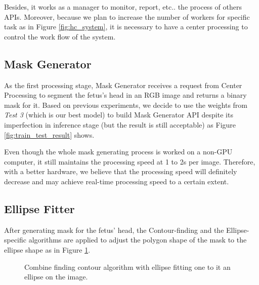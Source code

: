 	Besides, it works as a manager to monitor, report, etc.. the process of others APIs. Moreover, because we plan to increase the number of workers for specific task as in Figure \ref{fig:hc_system}, it is necessary to have a center processing to control the work flow of the system.

\subsection{Mask Generator}
\noindent
	
	As the first processing stage, Mask Generator receives a request from Center Processing to segment the fetus's head in an RGB image and returns a binary mask for it. Based on previous experiments, we decide to use the weights from \textit{Test 3} (which is our best model) to build Mask Generator API despite its imperfection in inference stage (but the result is still acceptable) as Figure \ref{fig:train_test_result} shows. 
	
	Even though the whole mask generating process is worked on a non-GPU computer, it still maintains the processing speed at 1 to 2s per image. Therefore, with a better hardware, we believe that the processing speed will definitely decrease and may achieve real-time processing speed to a certain extent.
	
\subsection{Ellipse Fitter}
\noindent

	After generating mask for the fetus' head, the Contour-finding and the Ellipse-specific algorithms are applied to adjust the polygon shape of the mask to the ellipse shape as in Figure \ref{fig:post_process}.
	
	\begin{figure}[H]
		\centering
		\hfill %
		\hfill %
		\caption{Combine finding contour algorithm with ellipse fitting one to  it an ellipse on the image.}
		\label{fig:post_process}
	\end{figure}

